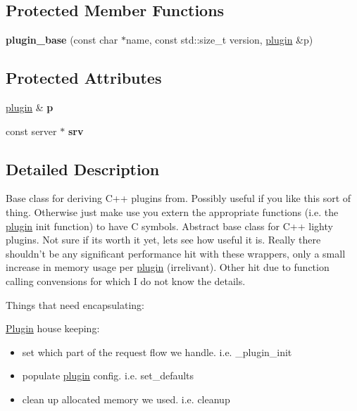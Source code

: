 \subsection*{Protected Member Functions}
\begin{CompactItemize}
\item 
\hypertarget{classplugin__base_7ce2c669c0efe22575ca69b3becdc237}{
\textbf{plugin\_\-base} (const char $\ast$name, const std::size\_\-t version, \hyperlink{structplugin}{plugin} \&p)}
\label{classplugin__base_7ce2c669c0efe22575ca69b3becdc237}

\end{CompactItemize}
\subsection*{Protected Attributes}
\begin{CompactItemize}
\item 
\hypertarget{classplugin__base_6e26cf6e1b55bc4a0c3d80cc57553e67}{
\hyperlink{structplugin}{plugin} \& \textbf{p}}
\label{classplugin__base_6e26cf6e1b55bc4a0c3d80cc57553e67}

\item 
\hypertarget{classplugin__base_e21602a179186848d2683d5203d811fe}{
const server $\ast$ \textbf{srv}}
\label{classplugin__base_e21602a179186848d2683d5203d811fe}

\end{CompactItemize}


\subsection{Detailed Description}
Base class for deriving C++ plugins from. Possibly useful if you like this sort of thing. Otherwise just make use you extern the appropriate functions (i.e. the \hyperlink{structplugin}{plugin} init function) to have C symbols. Abstract base class for C++ lighty plugins. Not sure if its worth it yet, lets see how useful it is. Really there shouldn't be any significant performance hit with these wrappers, only a small increase in memory usage per \hyperlink{structplugin}{plugin} (irrelivant). Other hit due to function calling convensions for which I do not know the details.

Things that need encapsulating:

\hyperlink{classPlugin}{Plugin} house keeping:\begin{itemize}
\item set which part of the request flow we handle. i.e. \_\-plugin\_\-init\item populate \hyperlink{structplugin}{plugin} config. i.e. set\_\-defaults\item clean up allocated memory we used. i.e. cleanup\end{itemize}


